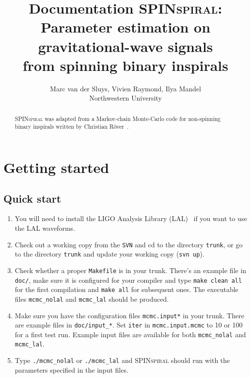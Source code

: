 \documentclass[10pt]{article}
\title{Documentation \textsc{SPINspiral}:\\
  Parameter estimation on gravitational-wave signals\\
  from spinning binary inspirals}
\author{Marc van der Sluys, Vivien Raymond, Ilya Mandel\\Northwestern University}
\begin{document}
\maketitle




\begin{abstract}
  \textsc{SPINspiral} was adapted from a Markov-chain Monte-Carlo code for non-spinning 
  binary inspirals written by Christian R\"over~\cite{RoeverThesis2007}.
\end{abstract}

\tableofcontents

\pagebreak


\section{Getting started}

\subsection{Quick start}

\begin{enumerate}
\item You will need to install the LIGO Analysis Library (LAL)~\cite{lal} if you want to use the LAL waveforms.
\item Check out a working copy from the \texttt{SVN} and cd to the directory \texttt{trunk}, or go to the
  directory \texttt{trunk} and update your working copy (\texttt{svn up}).
\item Check whether a proper \texttt{Makefile} is in your trunk.  There's an example file in \texttt{doc/}, 
  make sure it is configured for your compiler and type \texttt{make clean all} for the first compilation
  and \texttt{make all} for subsequent ones.  The executable files \texttt{mcmc\_nolal} and \texttt{mcmc\_lal} should be produced.
\item Make sure you have the configuration files \texttt{mcmc.input*} in your trunk.  There are example
  files in \texttt{doc/input\_*}.  Set \texttt{iter} in \texttt{mcmc.input.mcmc} to 10 or 100 for a first test run.
  Example input files are available for both \texttt{mcmc\_nolal} and \texttt{mcmc\_lal}.
\item Type \texttt{./mcmc\_nolal} or \texttt{./mcmc\_lal} and \textsc{SPINspiral} should run with the parameters specified
  in the input files.
\end{enumerate}
\end{document}
